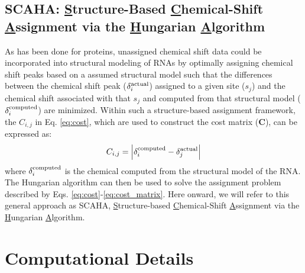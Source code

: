 \documentclass[journal=jcisd8,manuscript=article,layout=onecolumn]{achemso}
\begin{document}
\subsection{SCAHA: \underline{S}tructure-Based \underline{C}hemical-Shift \underline{A}ssignment via the \underline{H}ungarian \underline{A}lgorithm} As has been done for proteins\cite{meiler2003rapid, hart2008nmr, courtney2015experimental}, unassigned chemical shift data could be incorporated into structural modeling of RNAs by optimally assigning chemical shift peaks based on a assumed structural model such that the differences between the chemical shift  peak  ($\delta_{i}^{\rm actual}$) assigned to a given site ($s_{j}$) and the chemical shift associated with that $s_{j}$ and computed from that structural model ($\delta_{i}^{\rm computed}$) are minimized.  Within such a structure-based assignment framework, the $C_{i,j}$  in  Eq. \ref{eq:cost}, which are used to construct the cost matrix (\textbf{C}), can be expressed as:
\begin{equation}\label{eq:cost_matrix} 
C_{i,j} =  \Big{|} \delta_{i}^{\rm computed} - \delta_{j}^{\rm actual}\Big{|}
\end{equation}
where $\delta_{i}^{\rm computed}$ is the chemical computed from the structural model of the RNA. The Hungarian algorithm can then be used to solve the assignment problem described by Eqs.  \ref{eq:cost}-\ref{eq:cost_matrix}. Here onward, we will refer to this general approach as SCAHA, \underline{S}tructure-based \underline{C}hemical-Shift \underline{A}ssignment via the \underline{H}ungarian \underline{A}lgorithm.

\section{Computational Details}
\label{sec:2}
\end{document}
